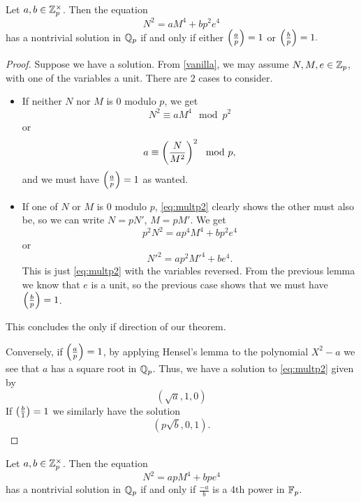 \documentclass[12pt, a4paper]{amsart}
\begin{document}
\begin{lemma} \label{multp2}
  Let $a, b \in {\mathbb Z}_p^\times$. Then the equation
  \begin{equation}
    \label{eq:multp2}
    N^2 = aM^4 + bp^2e^4
  \end{equation}
  has a nontrivial solution in ${\mathbb Q}_p$ if and only if either $\left(\frac{a}{p}\right) = 1$
  or $\left(\frac{b}{p}\right) = 1.$
\end{lemma}
\begin{proof}
  Suppose we have a solution.
  From \autoref{vanilla}, we may assume $N, M, e \in {\mathbb Z}_p$, with one of the
  variables a unit. There are 2 cases to consider.
  \begin{itemize}
  \item If neither $N$ nor $M$ is 0 modulo $p$, we get
    \[N^2 \equiv aM^4 \mod{p^2}\]
    or
    \[a \equiv \left(\frac{N}{M^2}\right)^2 \mod{p},\]
    and we must have $\left(\frac{a}{p}\right) = 1$ as wanted.
  \item If one of $N$ or $M$ is 0 modulo $p$, \autoref{eq:multp2} clearly shows
    the other must also be, so we can write $N = pN'$, $M = pM'$. We get
    \[p^2N^2 = ap^4M^4 + bp^2e^4\]
    or
    \[N'^2 = ap^2M'^4 + be^4.\]
    This is just \autoref{eq:multp2} with the variables reversed. From the
    previous lemma we know that $e$ is a unit, 
    so the previous case shows that we must have
    $\left(\frac{b}{p}\right)=1$.
  \end{itemize}
  This concludes the only if direction of our theorem.

  Conversely, if $\left(\frac{a}{p}\right) = 1$, by applying Hensel's
  lemma to the polynomial $X^2 - a$ we see that $a$ has a square root in
  ${\mathbb Q}_p$. Thus, we have a solution
  to \autoref{eq:multp2} given by
  \[(\sqrt{a}, 1, 0)\]
  If $\left(\frac{b}{1}\right) = 1$ we similarly have the solution
  \[(p\sqrt{b}, 0, 1).\]
  
\end{proof}

\begin{lemma} \label{multpp}
  Let $a, b \in {\mathbb Z}_p^\times$. Then the equation
  \begin{equation}
    \label{eq:multpp}
    N^2 = apM^4 + bpe^4
  \end{equation}
  has a nontrivial solution in ${\mathbb Q}_p$ if and only if
  $\frac{-a}{b}$ is a 4th power in $\mathbb{F}_p$.
\end{lemma}
\end{document}
